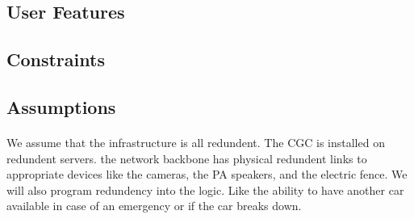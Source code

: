 \documentclass[12pt]{article}
\begin{document}
		\paragraph{} 
		
		\paragraph{} 
		
		\paragraph{} 

	\subsection{User Features}
		\paragraph{} 
		
		\paragraph{} 
		
		\paragraph{} 
	
	\subsection{Constraints}
		\paragraph{}

	\subsection{Assumptions}
		\paragraph{} We assume that the infrastructure is all redundent. The CGC is installed on redundent servers. 
		the network backbone has physical redundent links to appropriate devices like the cameras, the PA speakers, and the electric fence. We will also
		program redundency into the logic. Like the ability to have another car available in case of an emergency or if the car breaks down.
		
\end{document}
